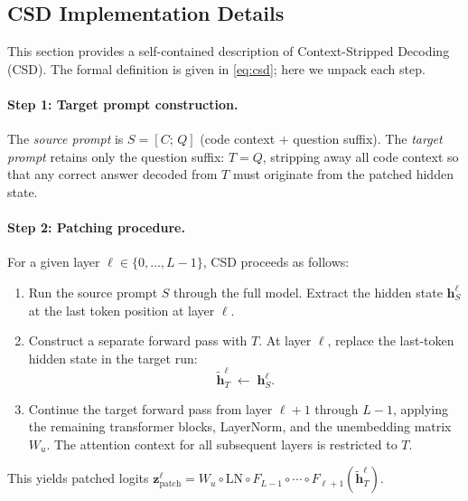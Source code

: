 \subsection{CSD Implementation Details}
\label{app:subsec:csd_implementation}

This section provides a self-contained description of Context-Stripped Decoding (CSD). The formal definition is given in \cref{eq:csd}; here we unpack each step.

\paragraph{Step 1: Target prompt construction.}
The \emph{source prompt} is $S = [C;\, Q]$ (code context + question suffix).
The \emph{target prompt} retains only the question suffix: $T = Q$, stripping away all code context so that any correct answer decoded from $T$ must originate from the patched hidden state.

\paragraph{Step 2: Patching procedure.}
For a given layer $\ell \in \{0, \dots, L{-}1\}$, CSD proceeds as follows:
\begin{enumerate}
    \item Run the source prompt $S$ through the full model. Extract the hidden state $\mathbf{h}^\ell_S$ at the last token position at layer $\ell$.
    \item Construct a separate forward pass with $T$. At layer $\ell$, replace the last-token hidden state in the target run:
    \begin{equation}
    \label{eq:csd_patch}
    \tilde{\mathbf{h}}^\ell_T \;\leftarrow\; \mathbf{h}^\ell_S.
    \end{equation}
    \item Continue the target forward pass from layer $\ell{+}1$ through $L{-}1$, applying the remaining transformer blocks, LayerNorm, and the unembedding matrix $W_u$. The attention context for all subsequent layers is restricted to $T$.
\end{enumerate}
This yields patched logits $\mathbf{z}_{\mathrm{patch}}^\ell = W_u \circ \mathrm{LN} \circ F_{L-1} \circ \cdots \circ F_{\ell+1}(\tilde{\mathbf{h}}^\ell_T)$.

